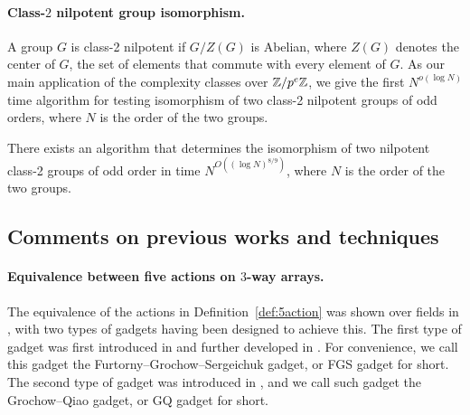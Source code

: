 


\paragraph{Class-$2$ nilpotent group isomorphism.}
A group $G$ is class-2 nilpotent if $G / Z(G)$ is Abelian, where $Z(G)$ denotes the center of $G$, the set of elements that commute with every element of $G$. %
As our main application of the \TIlong complexity classes over $\mathbb{Z}/p^e\mathbb{Z}$, we give the first $N^{o(\log N)}$ time algorithm for testing isomorphism of two class-2 nilpotent groups of odd orders, where $N$ is the order of the two groups.


\begin{theorem}\label{thm:tensor_isomorphism_main}
There exists an algorithm that determines the isomorphism of two nilpotent class-2 groups of odd order in time $N^{O((\log N)^{8/9})}$, where $N$ is the order of the two groups.
\end{theorem}

\subsection{Comments on previous works and techniques}\label{sec:issue}

\paragraph{Equivalence between five actions on $3$-way arrays.} The equivalence of the actions in Definition~\ref{def:5action} was shown over fields in \cite{FGS19,TI1,GQT,TI4}, with two types of gadgets having been designed to achieve this. The first type of gadget was first introduced in \cite{FGS19} and further developed in \cite{TI1,GQT}. For convenience, we call this gadget the Furtorny--Grochow--Sergeichuk gadget, or FGS gadget for short. The second type of gadget was introduced in \cite{TI4}, and we call such gadget the Grochow--Qiao gadget, or GQ gadget for short. 

